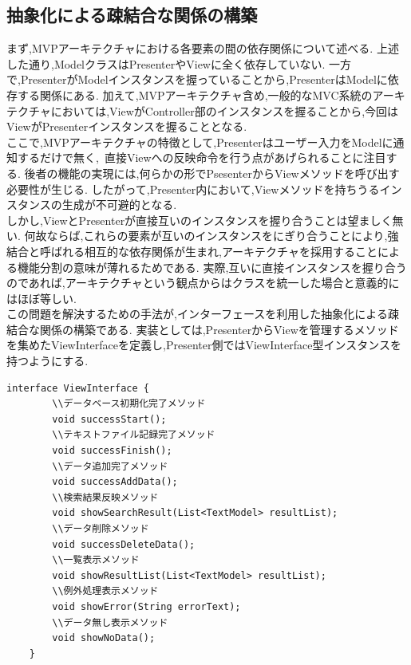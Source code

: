 \documentclass[uplatex,12pt]{jsarticle}
\begin{document}
\subsection{抽象化による疎結合な関係の構築}
まず,MVPアーキテクチャにおける各要素の間の依存関係について述べる.
上述した通り,ModelクラスはPresenterやViewに全く依存していない.
一方で,PresenterがModelインスタンスを握っていることから,PresenterはModelに依存する関係にある.
加えて,MVPアーキテクチャ含め,一般的なMVC系統のアーキテクチャにおいては,ViewがController部のインスタンスを握ることから,今回はViewがPresenterインスタンスを握ることとなる. \\
ここで,MVPアーキテクチャの特徴として,Presenterはユーザー入力をModelに通知するだけで無く, 直接Viewへの反映命令を行う点があげられることに注目する.
後者の機能の実現には,何らかの形でPsesenterからViewメソッドを呼び出す必要性が生じる.
したがって,Presenter内において,Viewメソッドを持ちうるインスタンスの生成が不可避的となる. \\
しかし,ViewとPresenterが直接互いのインスタンスを握り合うことは望ましく無い.
何故ならば,これらの要素が互いのインスタンスをにぎり合うことにより,強結合と呼ばれる相互的な依存関係が生まれ,アーキテクチャを採用することによる機能分割の意味が薄れるためである.
実際,互いに直接インスタンスを握り合うのであれば,アーキテクチャという観点からはクラスを統一した場合と意義的にはほぼ等しい. \\
この問題を解決するための手法が,インターフェースを利用した抽象化による疎結合な関係の構築である.
実装としては,PresenterからViewを管理するメソッドを集めたViewInterfaceを定義し,Presenter側ではViewInterface型インスタンスを持つようにする.
\begin{lstlisting}[caption=ViewInterfaceの定義, label=mid]
    interface ViewInterface {
        \\データベース初期化完了メソッド
        void successStart();
        \\テキストファイル記録完了メソッド
        void successFinish();
        \\データ追加完了メソッド
        void successAddData();
        \\検索結果反映メソッド
        void showSearchResult(List<TextModel> resultList);
        \\データ削除メソッド
        void successDeleteData();
        \\一覧表示メソッド
        void showResultList(List<TextModel> resultList);
        \\例外処理表示メソッド
        void showError(String errorText);
        \\データ無し表示メソッド
        void showNoData();
    }
\end{lstlisting}
\end{document}
